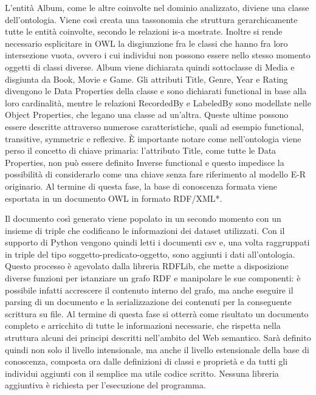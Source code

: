 \documentclass[Lau,binding=0.6cm,noexaminfo,oneside]{sapthesis}
\begin{document}
L'entità Album, come le altre coinvolte nel dominio analizzato, diviene una classe dell'ontologia. Viene così creata una tassonomia che struttura gerarchicamente tutte le entità coinvolte, secondo le relazioni is-a mostrate. Inoltre si rende necessario esplicitare in OWL la disgiunzione fra le classi che hanno fra loro intersezione vuota, ovvero i cui individui non possono essere nello stesso momento oggetti di classi diverse. Album viene dichiarata quindi sottoclasse di Media e disgiunta da Book, Movie e Game. Gli attributi Title, Genre, Year e Rating divengono le Data Properties della classe e sono dichiarati functional in base alla loro cardinalità, mentre le relazioni RecordedBy e LabeledBy sono modellate nelle Object Properties, che legano una classe ad un'altra. Queste ultime possono essere descritte attraverso numerose caratteristiche, quali ad esempio functional, transitive, symmetric e reflexive. \MakeUppercase{è} importante notare come nell'ontologia viene perso il concetto di chiave primaria: l'attributo Title, come tutte le Data Properties, non può essere definito Inverse functional e questo impedisce la possibilità di considerarlo come una chiave senza fare riferimento al modello E-R originario. Al termine di questa fase, la base di conoscenza formata viene esportata in un documento OWL in formato RDF/XML*.\medskip

Il documento così generato viene popolato in un secondo momento con un insieme di triple che codificano le informazioni dei dataset utilizzati. Con il supporto di Python vengono quindi letti i documenti csv e, una volta raggruppati in triple del tipo soggetto-predicato-oggetto, sono aggiunti i dati all'ontologia. Questo processo è agevolato dalla libreria RDFLib, che mette a disposizione diverse funzioni per istanziare un grafo RDF e manipolare le sue componenti: è possibile infatti accrescere il contenuto interno del grafo, ma anche eseguire il parsing di un documento e la serializzazione dei contenuti per la conseguente scrittura su file. Al termine di questa fase si otterrà come risultato un documento completo e arricchito di tutte le informazioni necessarie, che rispetta nella struttura alcuni dei principi descritti nell'ambito del Web semantico. Sarà definito quindi non solo il livello intensionale, ma anche il livello estensionale della base di conoscenza, composta ora dalle definizioni di classi e proprietà e da tutti gli individui aggiunti con il semplice ma utile codice scritto. Nessuna libreria aggiuntiva è richiesta per l'esecuzione del programma.
\end{document}
